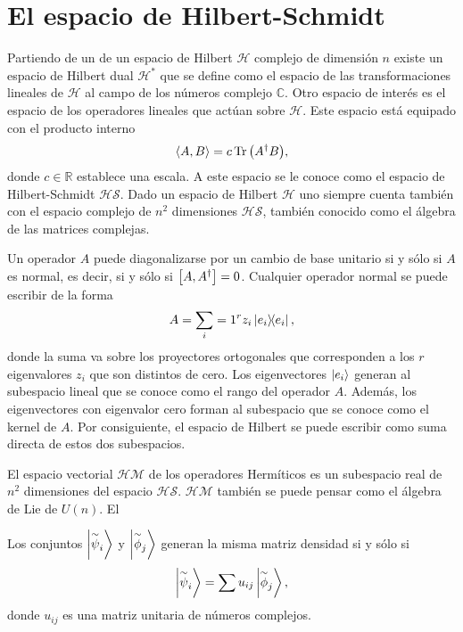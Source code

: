 \documentclass[12pt]{report}
\begin{document}
\section{El espacio de Hilbert-Schmidt}
Partiendo de un de un espacio de Hilbert $\mathcal{H}$ complejo de dimensión $n$ existe un espacio de 
Hilbert dual $\mathcal{H}^*$ que se define como el espacio de las transformaciones lineales de $\mathcal{H}$
al campo de los números complejo $\mathbb{C}$. Otro espacio de interés es el espacio de los operadores 
lineales que actúan sobre $\mathcal{H}$. Este espacio está equipado con el producto interno
\begin{equation}
\langle A,B\rangle=c\Tr \qty(A^{\dagger}B),
\label{eq:HS_innerP}
\end{equation}
donde $c\in \mathbb{R}$ establece una escala. A este espacio se le conoce como el espacio de
Hilbert-Schmidt $\mathcal{HS}$. Dado un espacio de Hilbert $\mathcal{H}$ uno siempre cuenta también
con el espacio complejo de $n^2$ dimensiones $\mathcal{HS}$, también conocido como el álgebra de las 
matrices complejas.

Un operador $A$ puede diagonalizarse por un cambio de base unitario si y sólo si $A$ es normal, es decir,
si y sólo si $\comm{A}{A^{\dagger}}=0$. Cualquier operador normal se puede escribir de la forma
\begin{equation}
A=\sum _i=1^rz_i\dyad{e_i}{e_i},
\end{equation} 
donde la suma va sobre los proyectores ortogonales que corresponden a los $r$ eigenvalores $z_i$ que
son distintos de cero. Los eigenvectores $\ket{e_i}$ generan al subespacio lineal que se conoce como
el rango del operador $A$. Además, los eigenvectores con eigenvalor cero forman al subespacio que se
conoce como el kernel de $A$. Por consiguiente, el espacio de Hilbert se puede escribir como suma
directa de estos dos subespacios. 

El espacio vectorial $\mathcal{HM}$ de los operadores Hermíticos es un subespacio real de $n^2$ dimensiones
del espacio $\mathcal{HS}$. $\mathcal{HM}$ también se puede pensar como el álgebra de Lie de $U(n)$. El 



\begin{teorema}
Los conjuntos $\ket{\overset{\sim}{\psi}_i}$ y $\ket{\overset{\sim}{\phi}_j}$ generan la misma matriz densidad si
y sólo si 
\begin{equation}
\ket{\overset{\sim}{\psi}_i}=\sum u_{ij}\ket{\overset{\sim}{\phi}_j},
\end{equation}
donde $u_{ij}$ es una matriz unitaria de números complejos.
\end{teorema}
\end{document}

